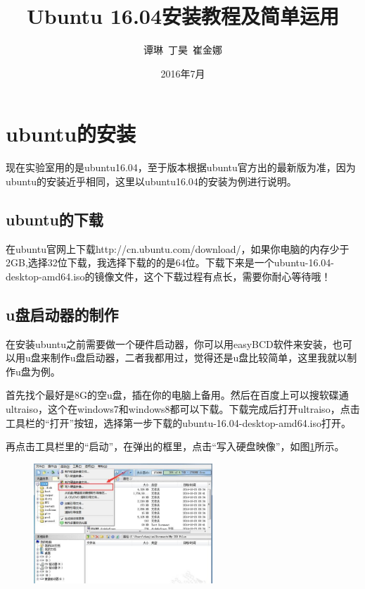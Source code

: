 \documentclass[12pt]{article}
\begin{document}
\title{\vspace{-2em}Ubuntu 16.04安装教程及简单运用\vspace{0.7em}}%
\author{谭琳\ 丁昊\ 崔金娜}%
\date{\vspace{-0.7em}2016年7月\vspace{-0.7em}}%
\maketitle\thispagestyle{fancy}%
\maketitle
\tableofcontents 
\section{ubuntu的安装}

现在实验室用的是ubuntu16.04，至于版本根据ubuntu官方出的最新版为准，因为ubuntu的安装近乎相同，这里以ubuntu16.04的安装为例进行说明。

\subsection{ubuntu的下载}

  在ubuntu官网上下载http://cn.ubuntu.com/download/，如果你电脑的内存少于2GB,选择32位下载，我选择下载的的是64位。下载下来是一个ubuntu-16.04-desktop-amd64.iso的镜像文件，这个下载过程有点长，需要你耐心等待哦！

\subsection{u盘启动器的制作}

  在安装ubuntu之前需要做一个硬件启动器，你可以用easyBCD软件来安装，也可以用u盘来制作u盘启动器，二者我都用过，觉得还是u盘比较简单，这里我就以制作u盘为例。

  首先找个最好是8G的空u盘，插在你的电脑上备用。然后在百度上可以搜软碟通ultraiso，这个在windows7和windows8都可以下载。下载完成后打开ultraiso，点击工具栏的“打开”按钮，选择第一步下载的ubuntu-16.04-desktop-amd64.iso打开。

  再点击工具栏里的“启动”，在弹出的框里，点击“写入硬盘映像”，如图\ref{tu1}所示。
\begin{figure}[!htb] %
\centering
\includegraphics[width=0.6\textwidth]{tu1.jpeg}
\caption{\small}
\label{tu1}
\end{figure}  
\end{document}

